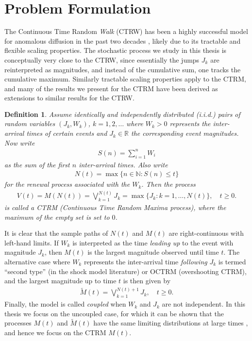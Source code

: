 \documentclass[honours,12pt]{UNSWthesis}
\newcommand{\R}{\mathbb{R}}
\newcommand{\1}{\mathbf 1}
\newtheorem{definition}[theorem]{Definition}
\numberwithin{equation}{section}
\theoremstyle{definition}
\theoremstyle{remark}
\begin{document}
\section{Problem Formulation}
The Continuous Time Random \emph{Walk} (CTRW) has been a highly successful 
model for anomalous diffusion in the past two decades 
\cite{Metzler2000,HLS2010b}, likely due to its tractable and flexible scaling
properties. The stochastic process we study in this thesis is conceptually very close
to the CTRW, since essentially the jumps $J_k$ are reinterpreted as 
magnitudes, and instead of the cumulative sum, one tracks the cumulative 
maximum. Similarly tractable scaling properties apply to the CTRM, and many of the results we present for the CTRM have been derived as extensions to similar results for the CTRW.

\begin{definition}
Assume identically and independently distributed (i.i.d.) pairs of random variables $(J_k, W_k)$, $k = 1, 2, \ldots$
where $W_k > 0$ represents the inter-arrival times of certain events and 
$J_k \in \R$ the corresponding event magnitudes. Now write
\begin{align}
	S(n)=\sum_{i=1}^n W_i
\end{align}
as the sum of the first $n$ inter-arrival times. Also write
\begin{align} \label{eq:renewal-process}
N(t) = \max\{n \in \mathbb N: S(n) \le t\}
\end{align}
for the renewal process associated with the $W_k$. Then the process
\begin{align}
V(t)=M(N(t)) = \bigvee_{k=1}^{N(t)} J_k
= \max\{J_k: k = 1, \ldots, N(t)\}, \quad t \ge 0.
\end{align}
is called a CTRM (Continuous Time Random Maxima process), where the maximum of the empty set is set to $0$.\\
\end{definition}

It is clear that the sample paths of $N(t)$ and $M(t)$ are right-continuous
with left-hand limits. 
If $W_k$ is interpreted as the time \emph{leading up} to the event with magnitude
$J_k$, then $M(t)$ is the largest magnitude observed until time $t$.
The alternative case where $W_k$ represents the inter-arrival time 
\textit{following} $J_k$ 
is termed ``second type'' (in the shock model literature) or OCTRM
(overshooting CTRM), and the largest magnitude up to time $t$ is then
given by
\begin{align}
\tilde M(t) = \bigvee_{k=1}^{N(t)+1} J_k, \quad t \ge 0.
\end{align}
Finally, the model is called \emph{coupled} when $W_k$ and $J_k$ are not independent.
In this thesis we focus on the uncoupled case,  
for which it can be shown that the processes $M(t)$ and
$\tilde M(t)$ have the same limiting distributions at large times
\cite{Hees2015}, and hence we focus on the CTRM $M(t)$. 
\end{document}
